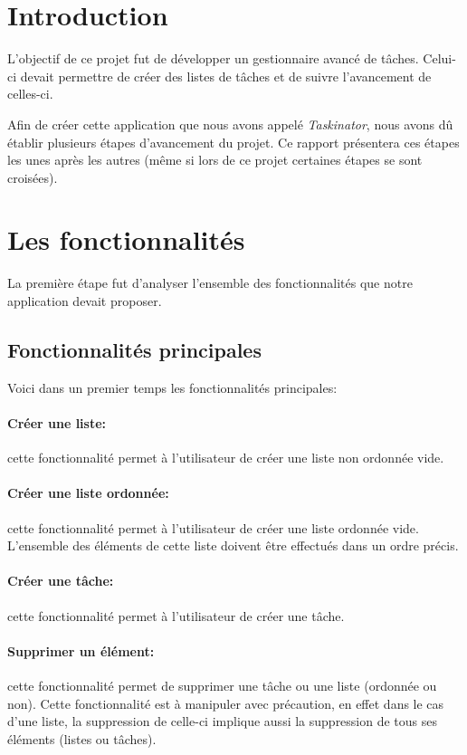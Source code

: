\documentclass[a4paper,10pt]{article}
\begin{document}
\section{Introduction}
L'objectif de ce projet fut de développer un gestionnaire avancé de tâches. Celui-ci devait permettre de créer des listes de tâches et de suivre l'avancement de celles-ci.

Afin de créer cette application que nous avons appelé \textit{Taskinator}, nous avons dû établir plusieurs étapes d'avancement du projet. Ce rapport présentera ces étapes les unes après les autres (même si lors de ce projet certaines étapes se sont croisées).

\newpage
\section{Les fonctionnalités}
La première étape fut d'analyser l'ensemble des fonctionnalités que notre application devait proposer. 

\subsection{Fonctionnalités principales}
Voici dans un premier temps les fonctionnalités principales:
\paragraph{Créer une liste:} cette fonctionnalité permet à l'utilisateur de créer une liste non ordonnée vide.
\paragraph{Créer une liste ordonnée:} cette fonctionnalité permet à l'utilisateur de créer une liste ordonnée vide. L'ensemble des éléments de cette liste doivent être effectués dans un ordre précis.
\paragraph{Créer une tâche:} cette fonctionnalité permet à l'utilisateur de créer une tâche.
\paragraph{Supprimer un élément:} cette fonctionnalité permet de supprimer une tâche ou une liste (ordonnée ou non). Cette fonctionnalité est à manipuler avec précaution, en effet dans le cas d'une liste, la suppression de celle-ci implique aussi la suppression de tous ses éléments (listes ou tâches).
\end{document}

